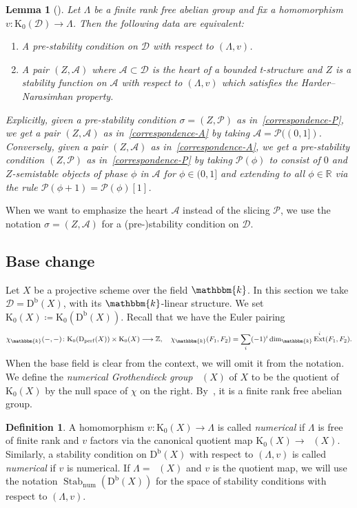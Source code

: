 \documentclass[11pt, reqno]{amsart}
\numberwithin{equation}{section}
\theoremstyle{plain}
\newtheorem{lemma}[theorem]{Lemma}
\theoremstyle{remark}
\theoremstyle{definition}
\newtheorem{definition}[theorem]{Definition}
\theoremstyle{italicsname}
\newcommand{\Db}{\mathrm{D^b}}
\newcommand{\Dperf}{\mathrm{D}_{\mathrm{perf}}}
\newcommand{\num}{\mathrm{num}}
\DeclareMathOperator{\Knum}{\rK_{\num}}
\DeclareMathOperator{\Stab}{Stab}
\DeclareMathOperator{\Ext}{Ext}
\newcommand{\cA}{\mathscr{A}}
\newcommand{\cD}{\mathscr{D}}
\newcommand{\cP}{\mathscr{P}}
\newcommand{\rK}{\mathrm{K}}
\newcommand{\KK}{\mathbbm{k}}
\def\RR{\ensuremath{\mathbb{R}}}
\def\ZZ{\ensuremath{\mathbb{Z}}}
\begin{document}
\begin{lemma}[{\cite[Proposition~5.3]{Bridgeland:Stab}}]
    Let $\Lambda$ be a finite rank free abelian group and fix a homomorphism
    $v \colon \rK_0(\cD) \to \Lambda$. 
    Then the following data are equivalent: 
    \begin{enumerate}[{\rm (1)}]
        \item \label{correspondence-P} A pre-stability condition on $\cD$ with respect to $(\Lambda, v)$. 
        \item \label{correspondence-A} A pair $(Z, \cA)$ where $\cA \subset \cD$ is the heart of a bounded t-structure and $Z$ is a stability function on $\cA$ with respect to $(\Lambda, v)$ which satisfies the Harder--Narasimhan property.
    \end{enumerate}
    Explicitly, given a pre-stability condition $\sigma = (Z, \cP)$ as in~\ref{correspondence-P}, we get a pair $(Z, \cA)$ as in~\ref{correspondence-A} by taking $\cA = \cP((0,1])$. 
    Conversely, given a pair $(Z, \cA)$ as in~\ref{correspondence-A}, we get a pre-stability condition $(Z, \cP)$ as in~\ref{correspondence-P} by taking $\cP(\phi)$ to consist of $0$ and $Z$-semistable objects of phase $\phi$ in $\cA$ for $\phi \in (0,1]$ and extending to all $\phi \in \RR$ via the rule $\cP(\phi+1) = \cP(\phi)[1]$. 
\end{lemma}

When we want to emphasize the heart $\cA$ instead of the slicing $\cP$, we use the notation $\sigma = (Z, \cA)$ for a (pre-)stability condition on $\cD$. 


\subsection{Base change}\label{subsec:BaseChange}

Let $X$ be a projective scheme over the field $\KK$.
In this section we take $\cD=\Db(X)$, with its $\KK$-linear structure.
We set $\rK_0(X)\coloneqq \rK_0(\Db(X))$. 
Recall that we have the Euler pairing
\[
\chi_{\KK}(-,-)\colon \rK_0(\Dperf(X))\times \rK_0(X)\longrightarrow \ZZ,\quad \chi_\KK(F_1,F_2) = \sum_i (-1)^i \dim_\KK \Ext^i(F_1,F_2). 
\]
When the base field is clear from the context, we will omit it from the notation. 
We define the \emph{numerical Grothendieck group} $\Knum(X)$ of $X$ to be the quotient of $\rK_0(X)$ by the null space of $\chi$ on the right. 
By~\cite[Lemma 12.7]{stability-families}, it is a finite rank free abelian group. 

\begin{definition}
A homomorphism $v\colon\rK_0(X)\to\Lambda$ is called \emph{numerical} if $\Lambda$ is free of finite rank and $v$ factors via the canonical quotient map $\rK_0(X)\to\Knum(X)$.
Similarly, a stability condition on $\Db(X)$ with respect to $(\Lambda, v)$ is called \emph{numerical} if $v$ is numerical.
If $\Lambda=\Knum(X)$ and $v$ is the quotient map, we will use the notation $\Stab_\mathrm{num}(\Db(X))$ for the space of stability conditions with respect to $(\Lambda, v)$.
\end{definition}
\end{document}

